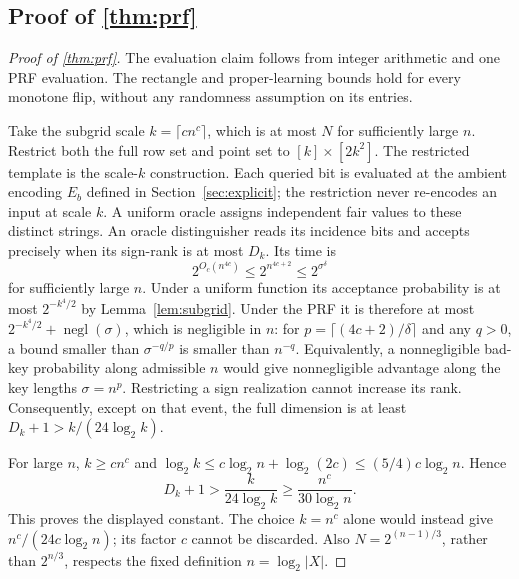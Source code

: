 \subsection[Proof of result prf]{Proof of \cref{thm:prf}}\label{proof:prf}
\begin{proof}[Proof of \cref{thm:prf}]
The evaluation claim follows from integer arithmetic and one PRF evaluation. The rectangle and proper-learning bounds hold for every monotone flip, without any randomness assumption on its entries.

Take the subgrid scale $k=\lceil c n^c\rceil$, which is at most $N$ for sufficiently large $n$. Restrict both the full row set and point set to $[k]\times[2k^2]$. The restricted template is the scale-$k$ construction. Each queried bit is evaluated at the ambient encoding $E_b$ defined in Section~\ref{sec:explicit}; the restriction never re-encodes an input at scale $k$. A uniform oracle assigns independent fair values to these distinct strings. An oracle distinguisher reads its incidence bits and accepts precisely when its sign-rank is at most $D_k$. Its time is
\[
 2^{O_c(n^{4c})}\le2^{n^{4c+2}}\le2^{\sigma^\delta}
\]
for sufficiently large $n$. Under a uniform function its acceptance probability is at most $2^{-k^4/2}$ by Lemma~\ref{lem:subgrid}. Under the PRF it is therefore at most $2^{-k^4/2}+\operatorname{negl}(\sigma)$, which is negligible in $n$: for $p=\lceil(4c+2)/\delta\rceil$ and any $q>0$, a bound smaller than $\sigma^{-q/p}$ is smaller than $n^{-q}$. Equivalently, a nonnegligible bad-key probability along admissible $n$ would give nonnegligible advantage along the key lengths $\sigma=n^p$. Restricting a sign realization cannot increase its rank. Consequently, except on that event, the full dimension is at least $D_k+1>k/(24\log_2k)$.

For large $n$, $k\ge c n^c$ and $\log_2k\le c\log_2n+\log_2(2c)\le(5/4)c\log_2n$. Hence
\[
 D_k+1>\frac{k}{24\log_2k}\ge\frac{n^c}{30\log_2n}.
\]
This proves the displayed constant. The choice $k=n^c$ alone would instead give $n^c/(24c\log_2n)$; its factor $c$ cannot be discarded. Also $N=2^{(n-1)/3}$, rather than $2^{n/3}$, respects the fixed definition $n=\log_2|X|$.
\end{proof}

